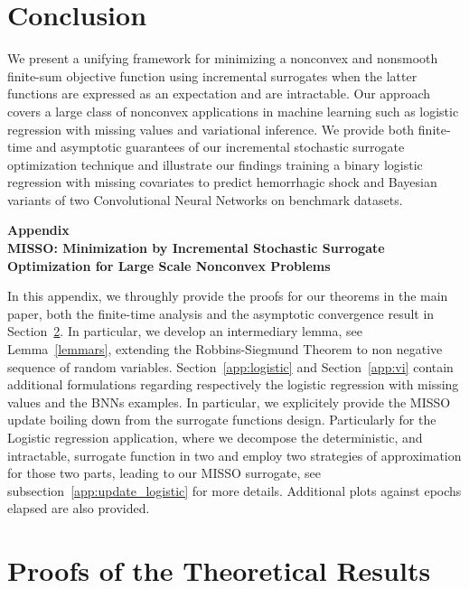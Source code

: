 \documentclass[final,12pt]{alt2022} %
\begin{document}
\vspace{-0.15in}
\section{Conclusion}
\vspace{-0.05in}
We present a unifying framework for minimizing a nonconvex and nonsmooth finite-sum objective function using incremental surrogates when the latter functions are expressed as an expectation and are intractable.
Our approach covers a large class of nonconvex applications in machine learning such as logistic regression with missing values and variational inference.
We provide both finite-time and asymptotic guarantees of our incremental stochastic surrogate optimization technique and illustrate our findings training a binary logistic regression with missing covariates to predict hemorrhagic shock and Bayesian variants of two Convolutional Neural Networks on benchmark datasets.




\clearpage


\appendix

\begin{center}
{\LARGE \textbf{Appendix \\
MISSO: Minimization by Incremental Stochastic Surrogate Optimization for Large Scale Nonconvex Problems}}
\end{center}
\vspace{0.5in}

In this appendix, we throughly provide the proofs for our theorems in the main paper, both the finite-time analysis and the asymptotic convergence result in Section~\ref{app:proofs}.
In particular, we develop an intermediary lemma, see Lemma~\ref{lemmars}, extending the Robbins-Siegmund Theorem to non negative sequence of random variables.
Section~\ref{app:logistic} and Section~\ref{app:vi} contain additional formulations regarding respectively the logistic regression with missing values and the BNNs examples. 
In particular, we explicitely provide the MISSO update boiling down from the surrogate functions design.
Particularly for the Logistic regression application, where we decompose the deterministic, and intractable, surrogate function in two and employ two strategies of approximation for those two parts, leading to our MISSO surrogate, see subsection~\ref{app:update_logistic} for more details.
Additional plots against epochs elapsed are also provided.

\section{Proofs of the Theoretical Results}\label{app:proofs}
\end{document}
